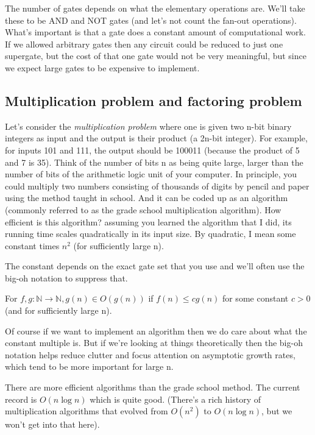 The number of gates depends on what the elementary operations are. We'll take these to be AND and NOT gates (and let's not count the fan-out operations). What's important is that a gate does a constant amount of computational work. If we allowed arbitrary gates then any circuit could be reduced to just one supergate, but the cost of that one gate would not be very meaningful, but since we expect large gates to be expensive to implement.

\subsection{Multiplication problem and factoring problem}
Let's consider the \textit{multiplication problem} where one is given two n-bit binary integers as input and the output is their product (a 2n-bit integer). For example, for inputs 101 and 111, the output should be 100011 (because the product of 5 and 7 is 35).
Think of the number of bits n as being quite large, larger than the number of bits of the arithmetic logic unit of your computer. In principle, you could multiply two numbers consisting of thousands of digits by pencil and paper using the method taught in school. And it can be coded up as an algorithm (commonly referred to as the grade school multiplication algorithm). How efficient is this algorithm? assuming you learned the algorithm that I did, its running time scales quadratically in its input size. By quadratic, I mean some constant times $n^2$ (for sufficiently large n).

The constant depends on the exact gate set that you use and we'll often use the big-oh notation to suppress that.

\begin{definition}
    For $f,g:\mathbb{N}\rightarrow\mathbb{N}, g(n) \in O(g(n))$ if $f(n)\leq cg(n)$ for some constant $c > 0$ (and for sufficiently large n).
\end{definition}
Of course if we want to implement an algorithm then we do care about what the constant multiple is. But if we're looking at things theoretically then the big-oh notation helps reduce clutter and focus attention on asymptotic growth rates, which tend to be more important for large n.

There are more efficient algorithms than the grade school method. The current record is $O(n \log n)$ which is quite good. (There's a rich history of multiplication algorithms that evolved from $O(n^2)$ to $O(n \log n)$, but we won't get into that here).

